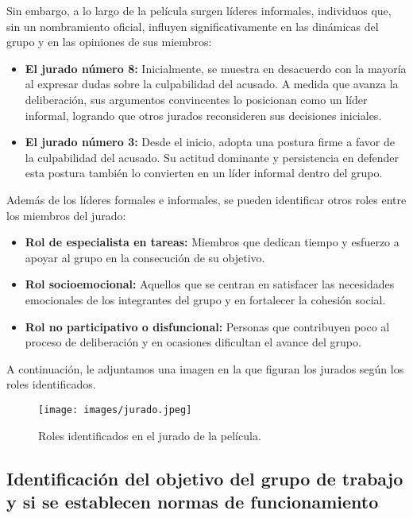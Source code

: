 \documentclass{article}
\begin{document}
Sin embargo, a lo largo de la película surgen líderes informales, individuos que, sin un nombramiento oficial, influyen significativamente en las dinámicas del grupo y en las opiniones de sus miembros:

\begin{itemize}
    \item \textbf{El jurado número 8:} Inicialmente, se muestra en desacuerdo con la mayoría al expresar dudas sobre la culpabilidad del acusado. A medida que avanza la deliberación, sus argumentos convincentes lo posicionan como un líder informal, logrando que otros jurados reconsideren sus decisiones iniciales.
    \item \textbf{El jurado número 3:} Desde el inicio, adopta una postura firme a favor de la culpabilidad del acusado. Su actitud dominante y persistencia en defender esta postura también lo convierten en un líder informal dentro del grupo.
\end{itemize}

Además de los líderes formales e informales, se pueden identificar otros roles entre los miembros del jurado:

\begin{itemize}
    \item \textbf{Rol de especialista en tareas:} Miembros que dedican tiempo y esfuerzo a apoyar al grupo en la consecución de su objetivo. 
    \item \textbf{Rol socioemocional:} Aquellos que se centran en satisfacer las necesidades emocionales de los integrantes del grupo y en fortalecer la cohesión social.
    \item \textbf{Rol no participativo o disfuncional:} Personas que contribuyen poco al proceso de deliberación y en ocasiones dificultan el avance del grupo.
\end{itemize}

A continuación, le adjuntamos una imagen en la que figuran los jurados según los roles identificados.
\newpage
\begin{figure}[H]
    \centering
    \texttt{[image: images/jurado.jpeg]}
    \caption{Roles identificados en el jurado de la película.}
    \label{fig:roles_jurado}
\end{figure}
\newpage

\subsection{Identificación del objetivo del grupo de trabajo y si se establecen normas de funcionamiento}
\end{document}

